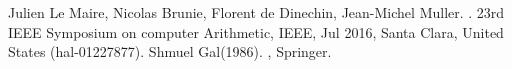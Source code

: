 \begin{thebibliography}{2}
 Julien Le Maire, Nicolas Brunie, Florent de Dinechin, Jean-Michel Muller. . 23rd IEEE Symposium on computer Arithmetic, IEEE, Jul 2016, Santa Clara, United States (hal-01227877).
 Shmuel Gal(1986). , Springer. 

\end{thebibliography}









